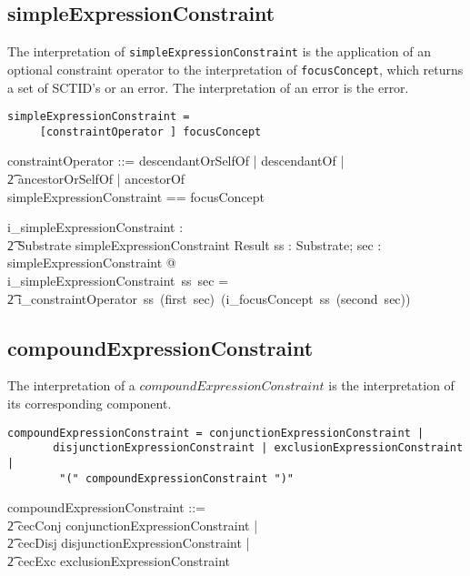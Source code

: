 \documentclass{article}
\def\spec#1{{\tt #1}}
\begin{document}
\subsection{simpleExpressionConstraint}
The interpretation of  \spec{simpleExpressionConstraint} is the application of an optional constraint 
operator to the interpretation of \spec{focusConcept}, which returns a set of SCTID's or an error.
The interpretation of an error is the error.


\begin{verbatim}
simpleExpressionConstraint =  
     [constraintOperator ] focusConcept
\end{verbatim}


\begin{zed}
constraintOperator ::= descendantOrSelfOf | descendantOf |  \\
\t2 ancestorOrSelfOf | ancestorOf \\
simpleExpressionConstraint == \optional[constraintOperator] \cross focusConcept 
\end{zed} 

\begin{gendef}
   i\_simpleExpressionConstraint : \\
\t2 Substrate \pfun simpleExpressionConstraint \pfun Result
\where
   \forall ss : Substrate; sec : simpleExpressionConstraint @ \\
i\_simpleExpressionConstraint~ss~sec =  \\
\t2 i\_constraintOperator~ss~(first~sec)~(i\_focusConcept~ss~(second~sec))
\end{gendef}


\subsection{compoundExpressionConstraint}
The interpretation of a $compoundExpressionConstraint$ is the interpretation of its corresponding component.
\begin{verbatim}
compoundExpressionConstraint = conjunctionExpressionConstraint |
       disjunctionExpressionConstraint | exclusionExpressionConstraint |
        "(" compoundExpressionConstraint ")"
\end{verbatim}

\begin{zed}
compoundExpressionConstraint ::= \\
\t2 cecConj \ldata conjunctionExpressionConstraint \rdata | \\
\t2 cecDisj \ldata disjunctionExpressionConstraint \rdata | \\
\t2 cecExc \ldata exclusionExpressionConstraint \rdata 
\end{zed}
\end{document}

